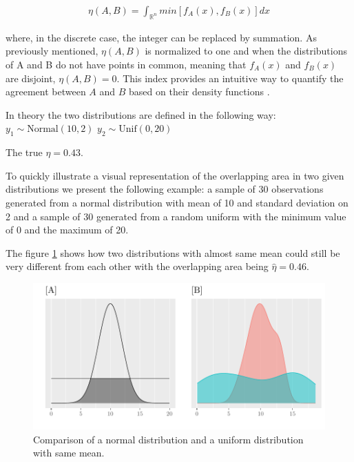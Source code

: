 \documentclass[10pt]{article}\usepackage[]{graphicx}\usepackage[]{xcolor}
\makeatletter
\def\maxwidth{ %
  \ifdim\Gin@nat@width>\linewidth
    \linewidth
  \else
    \Gin@nat@width
  \fi
}
\newenvironment{knitrout}{}{} %
\makeatother
\begin{document}
\begin{eqnarray}
\eta (A,B) = \int_{\mathbb{R}^n} min [f_A (x),f_B (x)] dx
\end{eqnarray} 

where, in the discrete case, the integer can be replaced by summation. As previously mentioned, $\eta (A,B)$ is normalized to one and when the distributions of A and B do not have points in common, meaning that $f_A (x)$ and $f_B (x)$ are disjoint, $\eta (A,B) = 0$. This index provides an intuitive way to quantify the agreement between $A$ and $B$ based on their density functions \cite{inman1989overlapping}. 






\vspace{.3cm}

In theory the two distributions are defined in the following way: 
$y_1 \sim \text{Normal}(10, 2)$ 
$y_2 \sim \text{Unif}(0, 20)$  

The true $\eta = 0.43$.


\vspace{.3cm}
To quickly illustrate a visual representation of the overlapping area in two given distributions we present the following example: a sample of 30 observations generated from a normal distribution with mean of 10 and standard deviation on 2 and a sample of 30 generated from a random uniform with the minimum value of 0 and the maximum of 20.





The figure \ref{fig:equalmeans} shows how two distributions with almost same mean could still be very different from each other with the overlapping area being $\hat{\eta} = 0.46$. 




\begin{knitrout}
\color{fgcolor}\begin{figure}

{\centering \includegraphics[width=\maxwidth]{figure/equalmeans-1} 

}

\caption[Comparison of a normal distribution and a uniform distribution with same mean]{Comparison of a normal distribution and a uniform distribution with same mean.}\label{fig:equalmeans}
\end{figure}

\end{knitrout}
\end{document}
